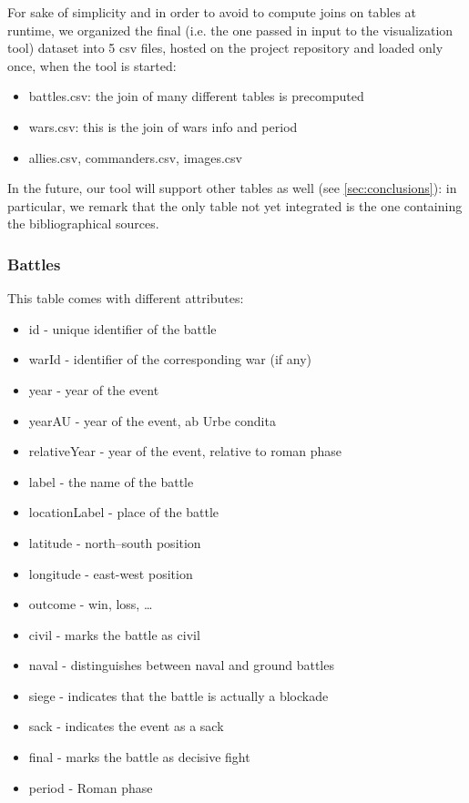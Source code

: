 For sake of simplicity and in order to avoid to compute joins on tables at runtime, we organized the final (i.e. the one passed in input to the visualization tool) dataset into 5 csv files, hosted on the project repository and loaded only once, when the tool is started:
\begin{itemize}
    \item battles.csv: the join of many different tables is precomputed
    \item wars.csv: this is the join of wars info and period
    \item allies.csv, commanders.csv, images.csv
\end{itemize}

In the future, our tool will support other tables as well (see \ref{sec:conclusions}): in particular, we remark that the only table not yet integrated is the one containing the bibliographical sources.

\subsubsection{Battles}
This table comes with different attributes:
\begin{itemize}
    \item id - unique identifier of the battle
    \item warId - identifier of the corresponding war (if any)
    \item year - year of the event
    \item yearAU - year of the event, ab Urbe condita
    \item relativeYear - year of the event, relative to roman phase
    \item label - the name of the battle
    \item locationLabel - place of the battle
    \item latitude - north–south position
    \item longitude - east-west position
    \item outcome - win, loss, \dots
    \item civil - marks the battle as civil
    \item naval - distinguishes between naval and ground battles
    \item siege - indicates that the battle is actually a blockade
    \item sack - indicates the event as a sack
    \item final - marks the battle as decisive fight
    \item period - Roman phase
\end{itemize}

